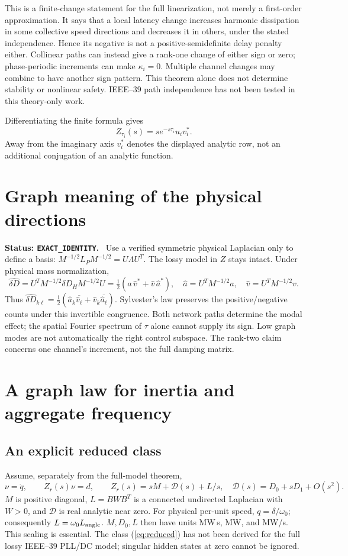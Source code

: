 \documentclass[11pt]{article}
\newcommand{\status}[1]{\par\smallskip\noindent\textbf{Status: \texttt{#1}.}\ }
\begin{document}
This is a finite-change statement for the full linearization, not
merely a first-order approximation. It says that a local latency
change increases harmonic dissipation in some collective speed
directions and decreases it in others, under the stated independence.
Hence its negative is not a positive-semidefinite delay penalty either.
Collinear paths can instead give a rank-one change of either sign or
zero; phase-periodic increments can make $\kappa_i=0$.
Multiple channel changes may combine to have another sign pattern.
This theorem alone does not determine stability or nonlinear safety.
IEEE--39 path independence has not been tested in this theory-only work.

Differentiating the finite formula gives
\begin{equation}
 Z_{\tau_i}(s)=s e^{-s\tau_i}u_iv_i^* . \label{eq:derivative}
\end{equation}
Away from the imaginary axis $v_i^*$ denotes the displayed analytic
row, not an additional conjugation of an analytic function.

\section{Graph meaning of the physical directions}
\status{EXACT\_IDENTITY}
Use a verified symmetric physical Laplacian only to define a basis:
$M^{-1/2}L_PM^{-1/2}=U\Lambda U^T$. The lossy model in $Z$ stays intact.
Under physical mass normalization,
\[
 \widehat{\delta D}=U^TM^{-1/2}\delta D_HM^{-1/2}U
 =\tfrac12(\widehat a\,\widehat v^*+\widehat v\,\widehat a^*),
 \quad \widehat a=U^TM^{-1/2}a,\quad \widehat v=U^TM^{-1/2}v .
\]
Thus $\widehat{\delta D}_{k\ell}
=\tfrac12(\widehat a_k\overline{\widehat v_\ell}
+\widehat v_k\overline{\widehat a_\ell})$.
Sylvester's law preserves the positive/negative counts under this
invertible congruence. Both network paths determine the modal effect;
the spatial Fourier spectrum of $\tau$ alone cannot supply its sign.
Low graph modes are not automatically the right control subspace.
The rank-two claim concerns one channel's increment, not the full
damping matrix.

\section{A graph law for inertia and aggregate frequency}
\subsection{An explicit reduced class}
Assume, separately from the full-model theorem,
\begin{equation}
 \nu=\dot q,\qquad Z_r(s)\nu=d,\qquad
 Z_r(s)=sM+\mathcal D(s)+L/s,\quad
 \mathcal D(s)=D_0+sD_1+O(s^2). \label{eq:reduced}
\end{equation}
$M$ is positive diagonal, $L=BWB^T$ is a connected undirected
Laplacian with $W>0$, and $\mathcal D$ is real analytic near zero.
For physical per-unit speed, $q=\delta/\omega_0$; consequently
$L=\omega_0 L_{\rm angle}$. $M,D_0,L$ then have units MW\,s, MW,
and MW/s. This scaling is essential.
The class (\ref{eq:reduced}) has not been derived for the full lossy
IEEE--39 PLL/DC model; singular hidden states at zero cannot be ignored.
\end{document}

